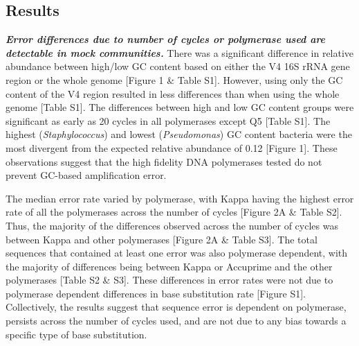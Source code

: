\documentclass[11pt,]{article}
\begin{document}
\newpage

\subsection{Results}\label{results}

\textbf{\emph{Error differences due to number of cycles or polymerase
used are detectable in mock communities.}} There was a significant
difference in relative abundance between high/low GC content based on
either the V4 16S rRNA gene region or the whole genome {[}Figure 1 \&
Table S1{]}. However, using only the GC content of the V4 region
resulted in less differences than when using the whole genome {[}Table
S1{]}. The differences between high and low GC content groups were
significant as early as 20 cycles in all polymerases except Q5 {[}Table
S1{]}. The highest (\emph{Staphylococcus}) and lowest
(\emph{Pseudomonas}) GC content bacteria were the most divergent from
the expected relative abundance of 0.12 {[}Figure 1{]}. These
observations suggest that the high fidelity DNA polymerases tested do
not prevent GC-based amplification error.

The median error rate varied by polymerase, with Kappa having the
highest error rate of all the polymerases across the number of cycles
{[}Figure 2A \& Table S2{]}. Thus, the majority of the differences
observed across the number of cycles was between Kappa and other
polymerases {[}Figure 2A \& Table S3{]}. The total sequences that
contained at least one error was also polymerase dependent, with the
majority of differences being between Kappa or Accuprime and the other
polymerases {[}Table S2 \& S3{]}. These differences in error rates were
not due to polymerase dependent differences in base substitution rate
{[}Figure S1{]}. Collectively, the results suggest that sequence error
is dependent on polymerase, persists across the number of cycles used,
and are not due to any bias towards a specific type of base
substitution.
\end{document}
